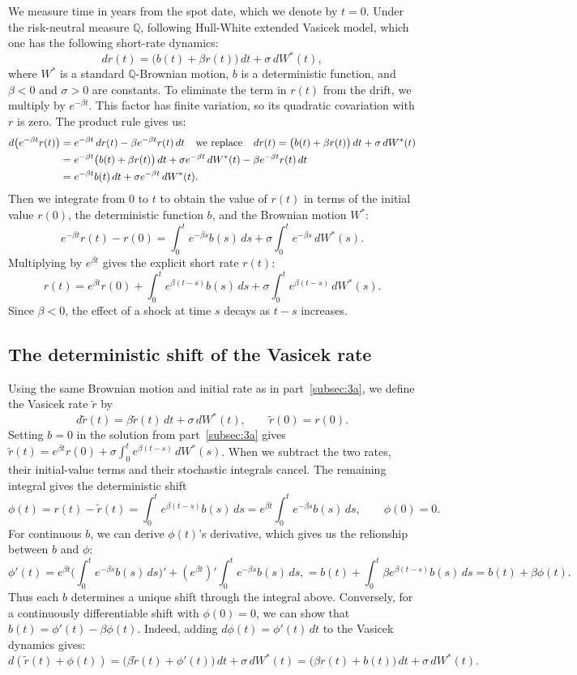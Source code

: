 \documentclass[11pt,a4paper]{article}
\begin{document}
We measure time in years from the spot date, which we denote by $t=0$. Under the risk-neutral measure $\mathbb{Q}$, following Hull-White extended Vasicek model, which one has the following short-rate dynamics:
\[
dr(t)=\bigl(b(t)+\beta r(t)\bigr)\,dt+\sigma\,dW^*(t),
\]
where $W^*$ is a standard $\mathbb{Q}$-Brownian motion, $b$ is a deterministic function, and $\beta<0$ and $\sigma>0$ are constants. To eliminate the term in $r(t)$ from the drift, we multiply by $e^{-\beta t}$. This factor has finite variation, so its quadratic covariation with $r$ is zero. The product rule gives us:
\begin{align*}
d\bigl(e^{-\beta t}r(t)\bigr)
  &= e^{-\beta t}\,dr(t)-\beta e^{-\beta t}r(t)\,dt \hspace{0.1in}\text{ we replace }\hspace{0.1in} dr(t)=\bigl(b(t)+\beta r(t)\bigr)\,dt+\sigma\,dW^*(t)\\
  &= e^{-\beta t}\bigl(b(t)+\beta r(t)\bigr)\,dt
     +\sigma e^{-\beta t}\,dW^*(t)-\beta e^{-\beta t}r(t)\,dt \\
  &= e^{-\beta t}b(t)\,dt+\sigma e^{-\beta t}\,dW^*(t).
\end{align*}
Then we integrate from $0$ to $t$ to obtain the value of $r(t)$ in terms of the initial value $r(0)$, the deterministic function $b$, and the Brownian motion $W^*$:
\[
e^{-\beta t}r(t)-r(0)
  = \int_0^t e^{-\beta s}b(s)\,ds
    +\sigma\int_0^t e^{-\beta s}\,dW^*(s).
\]
Multiplying by $e^{\beta t}$ gives the explicit short rate $r(t)$:
\[
r(t)=e^{\beta t}r(0)
     +\int_0^t e^{\beta(t-s)}b(s)\,ds
     +\sigma\int_0^t e^{\beta(t-s)}\,dW^*(s).
\]
Since $\beta<0$, the effect of a shock at time $s$ decays as $t-s$ increases.

\subsection{The deterministic shift of the Vasicek rate}\label{subsec:3b}

Using the same Brownian motion and initial rate as in part~\ref{subsec:3a}, we define the Vasicek rate $\tilde r$ by
\[
d\tilde r(t)=\beta\tilde r(t)\,dt+\sigma\,dW^*(t),
\qquad \tilde r(0)=r(0).
\]
Setting $b=0$ in the solution from part~\ref{subsec:3a} gives $\tilde r(t)=e^{\beta t}r(0)+\sigma\int_0^t e^{\beta(t-s)}\,dW^*(s)$. When we subtract the two rates, their initial-value terms and their stochastic integrals cancel. The remaining integral gives the deterministic shift
\[
\phi(t)=r(t)-\tilde r(t)=\int_0^t e^{\beta(t-s)}b(s)\,ds=e^{\beta t}\int_0^t e^{-\beta s}b(s)\,ds,
\qquad \phi(0)=0.
\]
For continuous $b$, we can derive $\phi(t)$'s derivative, which gives us the relionship between $b$ and $\phi$:
\[
\phi'(t)=e^{\beta t} \big(\int_0^t e^{-\beta s}b(s)\,ds\big)'+(e^{\beta t})'\int_0^t e^{-\beta s}b(s)\,ds,
=b(t)+\int_0^t \beta e^{\beta(t-s)}b(s)\,ds
        =b(t)+\beta\phi(t).
\]
Thus each $b$ determines a unique shift through the integral above. Conversely, for a continuously differentiable shift with $\phi(0)=0$, we can show that $b(t)=\phi'(t)-\beta\phi(t)$. Indeed, adding $d\phi(t)=\phi'(t)\,dt$ to the Vasicek dynamics gives:
\[
d(\tilde r(t)+\phi(t))
  =\bigl(\beta\tilde r(t)+\phi'(t)\bigr)\,dt+\sigma\,dW^*(t)
  =\bigl(\beta r(t)+b(t)\bigr)\,dt+\sigma\,dW^*(t).
\]
\end{document}
